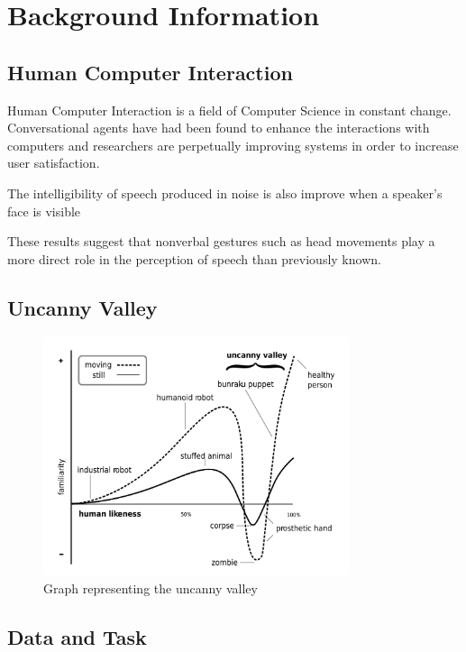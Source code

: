 \documentclass[bsc,frontabs,twoside,singlespacing,parskip]{infthesis}
\begin{document}
\chapter{Background Information}

\section{Human Computer Interaction}

Human Computer Interaction is a field of Computer Science in constant change. Conversational agents have had been found to enhance the interactions with computers  \cite{conv_agents}  and researchers are perpetually improving systems in order to increase user satisfaction. 

The intelligibility of speech produced in noise is also improve when a speaker's face is visible \cite{emotion_head_motion}

These results suggest that nonverbal gestures such as head movements play a more direct role in the perception of speech than previously known. \cite{vis_prosody}


\section{Uncanny Valley}

\begin{figure}[h!]
	\caption{Graph representing the uncanny valley}
	\centering
	\includegraphics[width=0.8\textwidth]{uncanny}
\end{figure}

\section{Data and Task}
\end{document}
